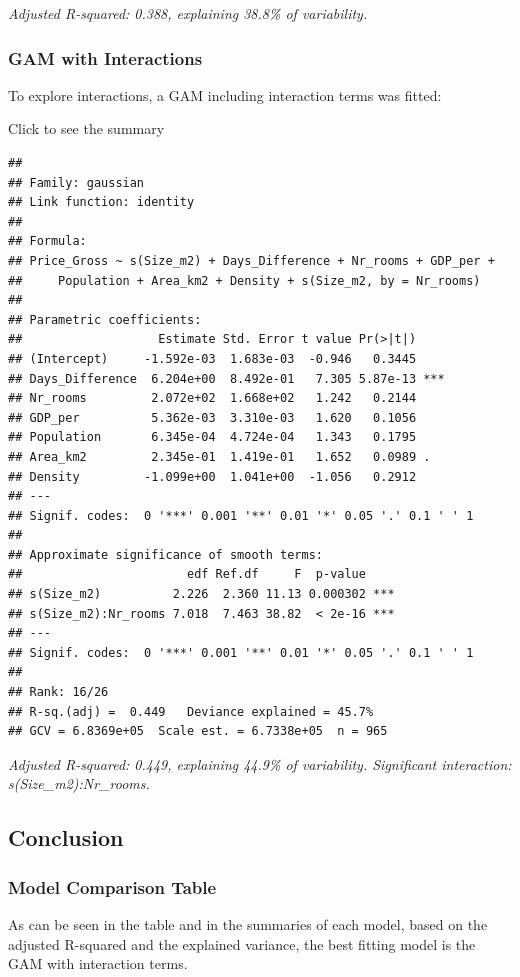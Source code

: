 \documentclass[
]{article}
\begin{document}
\emph{Adjusted R-squared: 0.388, explaining 38.8\% of variability.}

\subsubsection{GAM with Interactions}\label{gam-with-interactions}

To explore interactions, a GAM including interaction terms was fitted:

Click to see the summary

\begin{verbatim}
## 
## Family: gaussian 
## Link function: identity 
## 
## Formula:
## Price_Gross ~ s(Size_m2) + Days_Difference + Nr_rooms + GDP_per + 
##     Population + Area_km2 + Density + s(Size_m2, by = Nr_rooms)
## 
## Parametric coefficients:
##                   Estimate Std. Error t value Pr(>|t|)    
## (Intercept)     -1.592e-03  1.683e-03  -0.946   0.3445    
## Days_Difference  6.204e+00  8.492e-01   7.305 5.87e-13 ***
## Nr_rooms         2.072e+02  1.668e+02   1.242   0.2144    
## GDP_per          5.362e-03  3.310e-03   1.620   0.1056    
## Population       6.345e-04  4.724e-04   1.343   0.1795    
## Area_km2         2.345e-01  1.419e-01   1.652   0.0989 .  
## Density         -1.099e+00  1.041e+00  -1.056   0.2912    
## ---
## Signif. codes:  0 '***' 0.001 '**' 0.01 '*' 0.05 '.' 0.1 ' ' 1
## 
## Approximate significance of smooth terms:
##                       edf Ref.df     F  p-value    
## s(Size_m2)          2.226  2.360 11.13 0.000302 ***
## s(Size_m2):Nr_rooms 7.018  7.463 38.82  < 2e-16 ***
## ---
## Signif. codes:  0 '***' 0.001 '**' 0.01 '*' 0.05 '.' 0.1 ' ' 1
## 
## Rank: 16/26
## R-sq.(adj) =  0.449   Deviance explained = 45.7%
## GCV = 6.8369e+05  Scale est. = 6.7338e+05  n = 965
\end{verbatim}

\emph{Adjusted R-squared: 0.449, explaining 44.9\% of variability.
Significant interaction: s(Size\_m2):Nr\_rooms.}

\subsection{Conclusion}\label{conclusion-2}

\subsubsection{Model Comparison Table}\label{model-comparison-table}

As can be seen in the table and in the summaries of each model, based on
the adjusted R-squared and the explained variance, the best fitting
model is the GAM with interaction terms.
\end{document}
